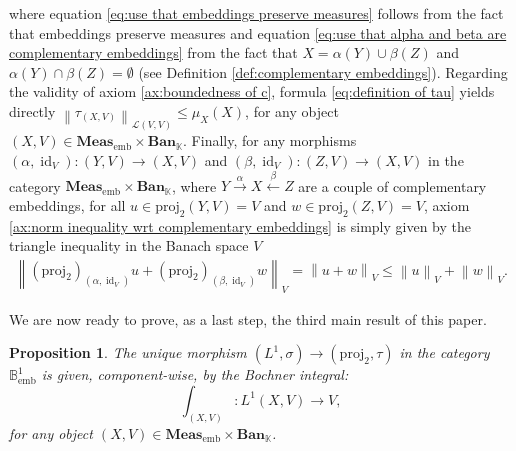 \documentclass{amsart}
\theoremstyle{definition}
\theoremstyle{plain}
\newtheorem{proposition}[definition]{Proposition}
\newcommand{\norm}[1]{\left\lVert #1\right\rVert} %
\newcommand{\id}{\operatorname{id}}
\newcommand{\embMeas}{\mathbf{Meas}_\mathrm{emb}}
\newcommand{\Ban}{\mathbf{Ban}_{\mathbb{K}}}
\newcommand{\proj}{\mathrm{proj}_{2}}
\newcommand{\Bemb}{\mathbb{B}_{\mathrm{emb}}^1}
\begin{document}
        where equation \eqref{eq:use that embeddings preserve measures} follows from the fact that embeddings preserve measures and equation \eqref{eq:use that alpha and beta are complementary embeddings} from the fact that $X = \alpha(Y) \cup \beta(Z)$ and $\alpha(Y) \cap \beta(Z) = \emptyset$ (see Definition \ref{def:complementary embeddings}).
        Regarding the validity of axiom \ref{ax:boundedness of c}, formula \eqref{eq:definition of tau} yields directly $\norm{\tau_{(X,V)}}_{\mathcal{L}(V,V)} \leq \mu_X(X)$, for any object $(X,V) \in \embMeas \times \Ban$.
        Finally, for any morphisms $(\alpha,\id_V) \colon (Y,V) \rightarrow (X,V)$ and $(\beta,\id_V) \colon (Z,V) \rightarrow (X,V)$ in the category $\embMeas \times \Ban$, where $Y \xrightarrow{~\alpha~} X \xleftarrow{~\beta~} Z$ are a couple of complementary embeddings, for all $u \in \proj(Y,V) = V$ and $w \in \proj(Z,V) = V$, axiom \ref{ax:norm inequality wrt complementary embeddings} is simply given by the triangle inequality in the Banach space $V$
        \begin{equation*}
            \begin{split}
                \norm{\left( \proj \right)_{(\alpha,\id_V)} u + \left( \proj \right)_{(\beta,\id_V)} w}_V = \norm{u + w}_V \leq \norm{u}_V + \norm{w}_V.
            \end{split}
        \end{equation*}

        We are now ready to prove, as a last step, the third main result of this paper.
        
        \begin{proposition}
        \label{prop:uniqueness of the Bochner integral}
            The unique morphism $(L^1,\sigma) \rightarrow (\proj,\tau)$ in the category $\Bemb$ is given, component-wise, by the Bochner integral:
            \begin{equation*}
                \int_{(X,V)} \colon L^1(X,V) \rightarrow V,
            \end{equation*}
            for any object $(X,V) \in \embMeas \times \Ban$. 
        \end{proposition}
\end{document}
